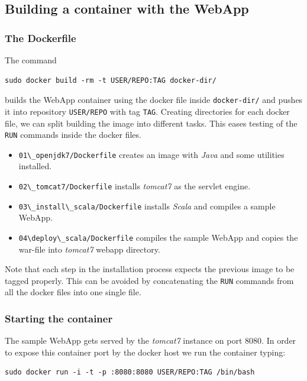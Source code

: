 \documentclass[11pt]{article}
\begin{document}
\subsection{Building a container with the WebApp}
\label{sec-4-5}
\subsubsection{The Dockerfile}
\label{sec-4-5-1}

The command 

\begin{verbatim}
sudo docker build -rm -t USER/REPO:TAG docker-dir/
\end{verbatim}
builds the WebApp container using the docker file inside \texttt{docker-dir/} and pushes it into repository \texttt{USER/REPO} with tag \texttt{TAG}. Creating directories for each docker file, we can split building the image into different tasks. This eases testing of the \texttt{RUN} commands inside the docker files. 
\begin{itemize}
\item \texttt{01\textbackslash{}\_openjdk7/Dockerfile} creates an image with \emph{Java} and some utilities installed.
\item \texttt{02\textbackslash{}\_tomcat7/Dockerfile} installs \emph{tomcat7} as the servlet engine.
\item \texttt{03\textbackslash{}\_install\textbackslash{}\_scala/Dockerfile} installs \emph{Scala} and compiles a sample WebApp.
\item \texttt{04\textbackslash{}deploy\textbackslash{}\_scala/Dockerfile}  compiles the sample WebApp and copies the war-file into \emph{tomcat7} webapp directory.
\end{itemize}

Note that each step in the installation process expects the previous image to be tagged properly. This can be avoided by concatenating the \texttt{RUN} commands from all the docker files into one single file.
\subsubsection{Starting the container}
\label{sec-4-5-2}

The sample WebApp gets served by the \emph{tomcat7} instance on port 8080. In order to expose this container port by the docker host we run the container  typing:

\begin{verbatim}
sudo docker run -i -t -p :8080:8080 USER/REPO:TAG /bin/bash
\end{verbatim}
\end{document}
